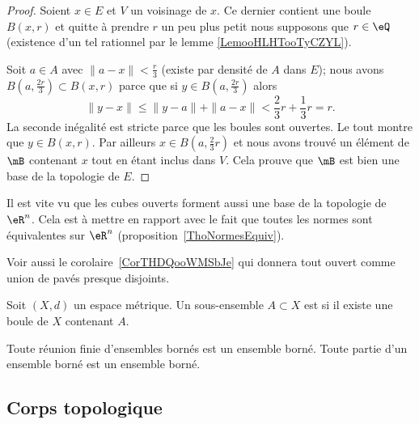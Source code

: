 \begin{proof}
    Soient \( x\in E\) et \( V\) un voisinage de \( x\). Ce dernier contient une boule \( B(x,r)\) et quitte à prendre \( r\) un peu plus petit nous supposons que \( r\in \eQ\) (existence d'un tel rationnel par le lemme \ref{LemooHLHTooTyCZYL}).

    Soit \( a\in A\) avec \( \| a-x \|<\frac{ r }{ 3 }\) (existe par densité de \( A\) dans \( E\)); nous avons \( B(a,\frac{ 2r }{ 3 })\subset B(x,r)\) parce que si \( y\in B( a,\frac{ 2r }{ 3 } )\) alors
    \begin{equation}
        \| y-x \|\leq \| y-a \|+\| a-x \|<\frac{ 2 }{ 3 }r+\frac{ 1 }{ 3 }r=r.
    \end{equation}
    La seconde inégalité est stricte parce que les boules sont ouvertes. Le tout montre que \( y\in B(x,r)\). Par ailleurs \( x\in B(a,\frac{ 2 }{ 3 }r)\) et nous avons trouvé un élément de \( \mB\) contenant \( x\) tout en étant inclus dans \( V\). Cela prouve que \( \mB\) est bien une base de la topologie de \( E\).
\end{proof}


\begin{remark}      \label{RemIPVLooHUXyeW}
    Il est vite vu que les cubes ouverts forment aussi une base de la topologie de \( \eR^n\). Cela est à mettre en rapport avec le fait que toutes les normes sont équivalentes sur \( \eR^n\) (proposition~\ref{ThoNormesEquiv}).


    Voir aussi le corolaire~\ref{CorTHDQooWMSbJe} qui donnera tout ouvert comme union de pavés presque disjoints.
\end{remark}

\begin{definition}\label{DefEnsembleBorne}
  Soit \( (X, d) \) un espace métrique. Un sous-ensemble $A \subset X$ est  si il existe une boule de $X$ contenant $A$.
\end{definition}

\begin{proposition}     \label{PROPooJIOAooWqzKMu}
  Toute réunion finie d'ensembles bornés est un ensemble borné. Toute partie d'un ensemble borné est un ensemble borné.
\end{proposition}

\subsection{Corps topologique}

